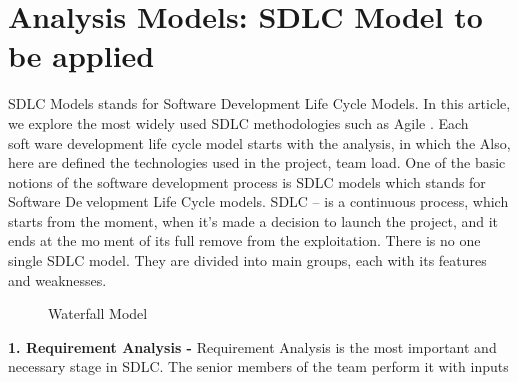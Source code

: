 \documentclass[oneside,a4paper,12pt]{report}
\begin{document}
\section{Analysis Models: SDLC Model to be applied}
\item SDLC Models stands for Software Development Life Cycle Models. In this article,
we explore the most widely used SDLC methodologies such as Agile . Each software development life cycle model starts with the analysis, in which the Also, here
are defined the technologies used in the project, team load. One of the basic notions
of the software development process is SDLC models which stands for Software Development Life Cycle models. SDLC – is a continuous process, which starts from
the moment, when it’s made a decision to launch the project, and it ends at the moment of its full remove from the exploitation. There is no one single SDLC model.
They are divided into main groups, each with its features and weaknesses.
 \begin{center}
	\begin{figure}[!htbp]
		\centering
	  \caption{Waterfall Model}
	  \label{fig:class-dig}
	\end{figure}
\end{center}
\item\textbf{1. Requirement Analysis -} Requirement Analysis is the most important and
necessary stage in SDLC. The senior members of the team perform it with inputs
\end{document}
